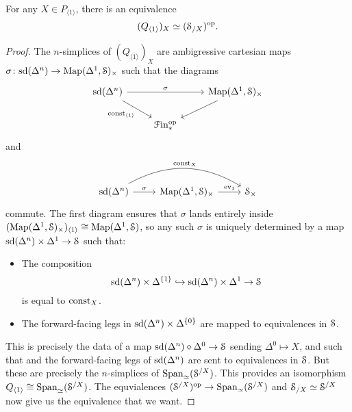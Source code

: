 \documentclass[main.tex]{subfiles}
\begin{document}
\begin{proposition}
  For any $X \in P_{\langle 1 \rangle}$, there is an equivalence
  \begin{equation*}
    (Q_{\langle 1 \rangle})_{X} \simeq (\S_{/X})\op.
  \end{equation*}
\end{proposition}
\begin{proof}
  The $n$-simplices of $(Q_{\langle 1 \rangle})_{X}$ are ambigressive cartesian maps $\sigma\colon \sd(\Delta^{n}) \to \Map(\Delta^{1}, \S)_{\times}$ such that the diagrams
  \begin{equation*}
    \begin{tikzcd}
      \sd(\Delta^{n})
      \arrow[rr, "\sigma"]
      \arrow[dr, swap, "\const_{\langle 1 \rangle}"]
      && \Map(\Delta^{1}, \S)_{\times}
      \arrow[dl]
      \\
      & \Finp\op
    \end{tikzcd}
  \end{equation*}
  and
  \begin{equation*}
    \begin{tikzcd}
      \sd(\Delta^{n})
      \arrow[rr, bend left, "\const_{X}"]
      \arrow[r, "\sigma"]
      & \Map(\Delta^{1}, \S)_{\times}
      \arrow[r, "\ev_{1}"]
      & \S_{\times}
    \end{tikzcd}
  \end{equation*}
  commute. The first diagram ensures that $\sigma$ lands entirely inside $(\Map(\Delta^{1}, \S)_{\times})_{\langle 1 \rangle} \cong \Map(\Delta^{1}, \S)$, so any such $\sigma$ is uniquely determined by a map $\sd(\Delta^{n}) \times \Delta^{1} \to \S$ such that:
  \begin{itemize}
    \item The composition
      \begin{equation*}
        \sd(\Delta^{n}) \times \Delta^{\{1\}} \hookrightarrow \sd(\Delta^{n}) \times \Delta^{1} \to \S
      \end{equation*}
      is equal to $\const_{X}$.

    \item The forward-facing legs in $\sd(\Delta^{n}) \times \Delta^{\{0\}}$ are mapped to equivalences in $\S$.
  \end{itemize}
  This is precisely the data of a map $\sd(\Delta^{n}) \diamond \Delta^{0} \to \S$ sending $\Delta^{0} \mapsto X$, and such that and the forward-facing legs of $\sd(\Delta^{n})$ are sent to equivalences in $\S$. But these are precisely the $n$-simplices of $\Span_{\simeq}(\S^{/X})$. This provides an isomorphism $Q_{\langle 1 \rangle} \cong \Span_{\simeq}(\S^{/X})$. The equvialences $(\S^{/X})\op \to \Span_{\simeq}(\S^{/X})$ and $\S_{/X} \simeq \S^{/X}$ now give us the equivalence that we want.
\end{proof}
\end{document}
